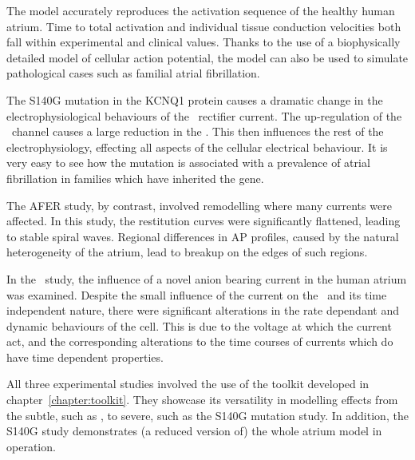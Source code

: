 The model accurately reproduces the activation sequence of the healthy human
atrium.
Time to total activation and individual tissue conduction velocities both fall
within experimental and clinical values.
Thanks to the use of a biophysically detailed model of cellular action
potential, the model can also be used to simulate pathological cases such as
familial atrial fibrillation.

The S140G mutation in the KCNQ1 protein causes a dramatic change in the
electrophysiological behaviours of the \ rectifier current.
The up-regulation of the \ channel causes a large reduction in the \apd.
This then influences the rest of the electrophysiology, effecting all aspects of
the cellular electrical behaviour.
It is very easy to see how the mutation is associated with a prevalence of
atrial fibrillation in families which have inherited the gene.

The AFER study, by contrast, involved remodelling where many currents were
affected.
In this study, the restitution curves were significantly flattened, leading to
stable spiral waves.
Regional differences in AP profiles, caused by the natural heterogeneity of the
atrium, lead to breakup on the edges of such regions.

In the \ study, the influence of a novel anion bearing current in the
human atrium was examined.
Despite the small influence of the current on the \apd\ and its time independent
nature, there were significant alterations in the rate dependant and dynamic
behaviours of the cell.
This is due to the voltage at which the current act, and the corresponding
alterations to the time courses of currents which do have time dependent
properties.

All three experimental studies involved the use of the toolkit developed in
chapter~\ref{chapter:toolkit}.
They showcase its versatility in modelling effects from the subtle, such as
, to severe, such as the S140G mutation study.
In addition, the S140G study demonstrates (a reduced version of) the whole
atrium model in operation.
